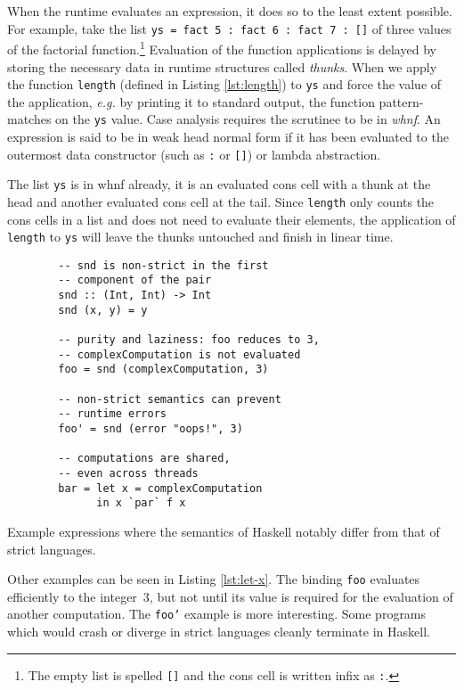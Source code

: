 \documentclass[thesis=B,english]{FITthesis}[2019/12/23]
\newcommand{\eg}{\emph{e.g.}\xspace}
\newcommand{\hsIdent}[1]{\texttt{#1}}
\newcommand{\hsCode}[1]{\texttt{#1}}
\begin{document}
When the runtime evaluates an expression, it does so to the least extent possible.
For example, take the list \hsCode{ys = fact 5 : fact 6 : fact 7 : []} of three
values of the factorial function.\footnote{
	The empty list is spelled \hsCode{[]} and the cons cell is written infix as
	\hsCode{:}.
} Evaluation of the function applications is delayed by storing the necessary
data in runtime structures called \textit{thunks}. When we apply the function
\hsIdent{length} (defined in Listing \ref{lst:length}) to \hsIdent{ys} and
force the value of the application, \eg by printing it to standard output, the
function pattern-matches on the \hsIdent{ys} value. Case analysis requires the
scrutinee to be in \textit{\acrfull{whnf}}. An expression is said to be in weak
head normal form if it has been evaluated to the outermost data constructor
(such as \hsCode{:} or \hsCode{[]}) or lambda abstraction.

The list \hsIdent{ys} is in \acrshort{whnf} already, it is an evaluated cons
cell with a thunk at the head and another evaluated cons cell at the tail.
Since \hsIdent{length} only counts the cons cells in a list and does not need
to evaluate their elements, the application of \hsIdent{length} to \hsIdent{ys}
will leave the thunks untouched and finish in linear time.

\begin{listing}[h]
	\centering
	\begin{verbatim}
		-- snd is non-strict in the first
		-- component of the pair
		snd :: (Int, Int) -> Int
		snd (x, y) = y

		-- purity and laziness: foo reduces to 3,
		-- complexComputation is not evaluated
		foo = snd (complexComputation, 3)

		-- non-strict semantics can prevent
		-- runtime errors
		foo' = snd (error "oops!", 3)

		-- computations are shared,
		-- even across threads
		bar = let x = complexComputation
		      in x `par` f x
	\end{verbatim}
	\caption[Example lazy expressions.]{Example expressions where the semantics
	of Haskell notably differ from that of strict languages.}
	\label{lst:let-x}
\end{listing}

Other examples can be seen in Listing \ref{lst:let-x}. The binding
\hsIdent{foo} evaluates efficiently to the integer~3, but not until its value
is required for the evaluation of another computation. The \hsIdent{foo'}
example is more interesting. Some programs which would crash or diverge in
strict languages cleanly terminate in Haskell.
\end{document}
